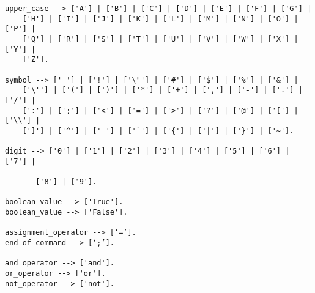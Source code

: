 \documentclass[12pt,letterpaper]{article}
\begin{document}
\begin{verbatim}
upper_case --> ['A'] | ['B'] | ['C'] | ['D'] | ['E'] | ['F'] | ['G'] |
    ['H'] | ['I'] | ['J'] | ['K'] | ['L'] | ['M'] | ['N'] | ['O'] | ['P'] |
    ['Q'] | ['R'] | ['S'] | ['T'] | ['U'] | ['V'] | ['W'] | ['X'] | ['Y'] |
    ['Z'].

symbol --> [' '] | ['!'] | ['\"'] | ['#'] | ['$'] | ['%'] | ['&'] |
    ['\''] | ['('] | [')'] | ['*'] | ['+'] | [','] | ['-'] | ['.'] | ['/'] |
    [':'] | [';'] | ['<'] | ['='] | ['>'] | ['?'] | ['@'] | ['['] | ['\\'] |
    [']'] | ['^'] | ['_'] | ['`'] | ['{'] | ['|'] | ['}'] | ['~'].

digit --> ['0'] | ['1'] | ['2'] | ['3'] | ['4'] | ['5'] | ['6'] | ['7'] |

       ['8'] | ['9'].

boolean_value --> ['True'].
boolean_value --> ['False'].

assignment_operator --> [‘=’].
end_of_command --> [‘;’].

and_operator --> ['and'].
or_operator --> ['or'].
not_operator --> ['not'].

\end{verbatim}
\end{document}

